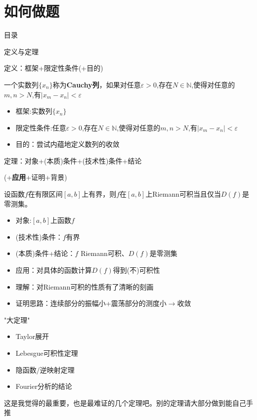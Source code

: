 \documentclass[pdf]{beamer}
\numberwithin{equation}{section}
\theoremstyle{plain}
\theoremstyle{plain}
\theoremstyle{plain}
\theoremstyle{remark}
\begin{document}
\section{如何做题}
\begin{frame}{目录}
\tableofcontents[currentsection]
\end{frame}
\begin{frame}{定义与定理}

定义：框架+限定性条件(+目的)
\begin{example}
	一个实数列$\{x_n\}$称为\textbf{Cauchy列}，如果对任意$\varepsilon >0$,存在$N \in \mathbb{N}$,使得对任意的$m,n >N$,有$|x_m-x_n| < \varepsilon$
	\begin{itemize}
		\item 框架:实数列$\{x_n\}$
		\item 限定性条件:任意$\varepsilon >0$,存在$N \in \mathbb{N}$,使得对任意的$m,n >N$,有$|x_m-x_n| < \varepsilon$
		\item 目的：尝试内蕴地定义数列的收敛
	\end{itemize}
\end{example}


\end{frame}
\begin{frame}
 定理：对象+(本质)条件+(技术性)条件+结论
 
 \phantom{定理：}(+\textbf{应用}+证明+背景)
	\begin{example}
	设函数$f$在有限区间$[a,b]$上有界，则$f$在$[a,b]$上Riemann可积当且仅当$D(f)$是零测集。
	
	\begin{itemize}
		\item 对象:$[a,b]$上函数$f$
		\item (技术性)条件：$f$有界
		\item (本质)条件+结论：$f$ Riemann可积、$D(f)$是零测集
		\item 应用：对具体的函数计算$D(f)$得到(不)可积性
		\item 理解：对Riemann可积的性质有了清晰的刻画
		\item 证明思路：连续部分的振幅小+震荡部分的测度小$\rightarrow$收敛
	\end{itemize}
\end{example}
\end{frame}
\begin{frame}{"大定理"}
\begin{itemize}
	\item Taylor展开
	\item Lebesgue可积性定理
	\item 隐函数/逆映射定理
	\item Fourier分析的结论
\end{itemize}
这是我觉得的最重要，也是最难证的几个定理吧。别的定理请大部分做到能自己手推
\end{frame}
\end{document}
